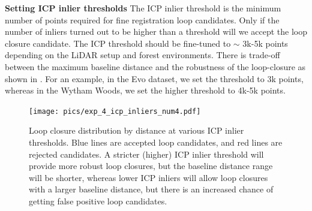 \noindent\textbf{Setting ICP inlier thresholds} \hspace{0.5em} The ICP inlier threshold is the minimum number of points required for fine registration loop candidates. Only if the number of inliers turned out to be higher than a threshold will we accept the loop closure candidate. 
The ICP threshold should be fine-tuned to $\sim$ 3k-5k points depending on the LiDAR setup and forest environments. There is trade-off between the maximum baseline distance and the robustness of the loop-closure as shown in . For an example, in the Evo dataset, we set the threshold to 3k points, whereas in the Wytham Woods, we set the higher threshold to 4k-5k points. \vspace{7pt}
 \begin{figure}[htbp]
  \centering
  \texttt{[image: pics/exp\_4\_icp\_inliers\_num4.pdf]}
  \caption{Loop closure distribution by distance at various ICP inlier thresholds. Blue lines are accepted loop candidates, and red lines are rejected candidates. A stricter (higher) ICP inlier threshold will provide more robust loop closures, but the baseline distance range will be shorter, whereas lower ICP inliers will allow loop closures with a larger baseline distance, but there is an increased chance of getting false positive loop candidates.}
  \label{fig:icp_inliers_num}
\end{figure}

